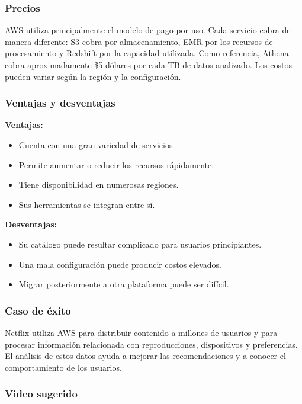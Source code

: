 \subsubsection*{Precios}

AWS utiliza principalmente el modelo de pago por uso. Cada servicio cobra de
manera diferente: S3 cobra por almacenamiento, EMR por los recursos de
procesamiento y Redshift por la capacidad utilizada. Como referencia, Athena
cobra aproximadamente \$5 dólares por cada TB de datos analizado. Los costos
pueden variar según la región y la configuración.

\subsubsection*{Ventajas y desventajas}

\textbf{Ventajas:}

\begin{itemize}
    \item Cuenta con una gran variedad de servicios.
    \item Permite aumentar o reducir los recursos rápidamente.
    \item Tiene disponibilidad en numerosas regiones.
    \item Sus herramientas se integran entre sí.
\end{itemize}

\textbf{Desventajas:}

\begin{itemize}
    \item Su catálogo puede resultar complicado para usuarios principiantes.
    \item Una mala configuración puede producir costos elevados.
    \item Migrar posteriormente a otra plataforma puede ser difícil.
\end{itemize}

\subsubsection*{Caso de éxito}

Netflix utiliza AWS para distribuir contenido a millones de usuarios y para
procesar información relacionada con reproducciones, dispositivos y
preferencias. El análisis de estos datos ayuda a mejorar las recomendaciones
y a conocer el comportamiento de los usuarios.

\subsubsection*{Video sugerido}


